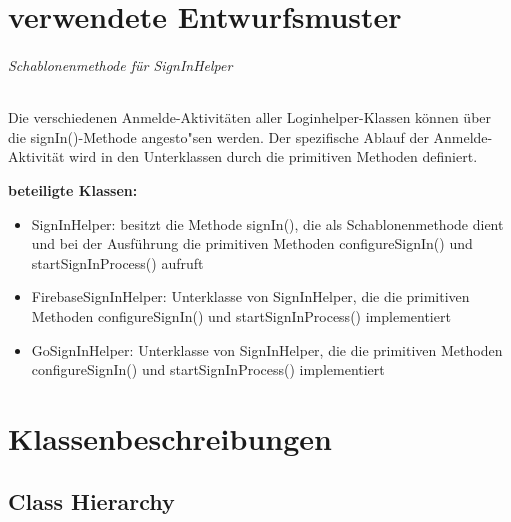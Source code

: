 \documentclass[11pt,a4paper]{report}
\begin{document}
\chapter{verwendete Entwurfsmuster} {

\subparagraph{Schablonenmethode für SignInHelper}
Die verschiedenen Anmelde-Aktivitäten aller Loginhelper-Klassen können über die signIn()-Methode angesto"sen werden. Der spezifische Ablauf der Anmelde-Aktivität wird in den Unterklassen durch die primitiven Methoden definiert.

\textbf{beteiligte Klassen:}
\begin{itemize}
	\item SignInHelper: besitzt die Methode signIn(), die als Schablonenmethode dient und bei der Ausführung die primitiven Methoden configureSignIn() und startSignInProcess() aufruft
	\item FirebaseSignInHelper: Unterklasse von SignInHelper, die die primitiven Methoden configureSignIn() und startSignInProcess() implementiert
	\item GoSignInHelper: Unterklasse von SignInHelper, die die primitiven Methoden configureSignIn() und startSignInProcess() implementiert
\end{itemize}

\chapter{Klassenbeschreibungen} {


\section*{Class Hierarchy}{
\thispagestyle{empty}
}}}
\end{document}
